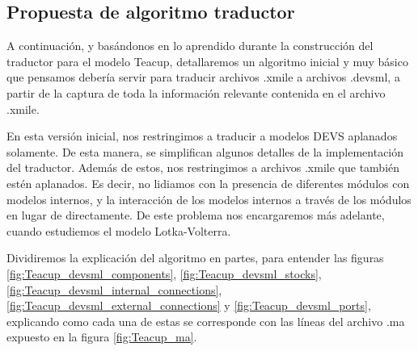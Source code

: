 \subsection{Propuesta de algoritmo traductor}
A continuación, y basándonos en lo aprendido durante la construcción del traductor para el modelo Teacup, detallaremos un algoritmo inicial y muy básico que pensamos debería servir para traducir archivos .xmile a archivos .devsml, a partir de la captura de toda la información relevante contenida en el archivo .xmile.

En esta versión inicial, nos restringimos a traducir a modelos DEVS aplanados solamente. De esta manera, se simplifican algunos detalles de la implementación del traductor. Además de estos, nos restringimos a archivos .xmile que también estén aplanados. Es decir, no lidiamos con la presencia de diferentes módulos con modelos internos, y la interacción de los modelos internos a través de los módulos en lugar de directamente. De este problema nos encargaremos más adelante, cuando estudiemos el modelo Lotka-Volterra.

Dividiremos la explicación del algoritmo en partes, para entender las figuras \ref{fig:Teacup_devsml_components}, \ref{fig:Teacup_devsml_stocks}, \ref{fig:Teacup_devsml_internal_connections}, \ref{fig:Teacup_devsml_external_connections} y \ref{fig:Teacup_devsml_ports}, explicando como cada una de estas se corresponde con las líneas del archivo .ma expuesto en la figura \ref{fig:Teacup_ma}.

